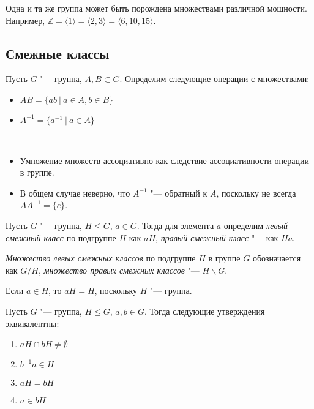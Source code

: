 \begin{note}
	Одна и та же группа может быть порождена множествами различной мощности. Например, $\mathbb{Z} = \langle 1\rangle = \langle 2, 3\rangle = \langle 6, 10, 15\rangle$.
\end{note}

\subsection{Смежные классы}

\begin{definition}
	Пусть $G$ "--- группа, $A, B \subset G$. Определим следующие операции с множествами:
	\begin{itemize}
		\item $AB = \{ab~|~a \in A, b \in B\}$
		\item $A^{-1} = \{a^{-1}~|~a\in A\}$
	\end{itemize}
\end{definition}

\begin{note}~
	\begin{itemize}
		\item Умножение множеств ассоциативно как следствие ассоциативности операции в группе.
		\item В общем случае неверно, что $A^{-1}$ "--- обратный к $A$, поскольку не всегда $AA^{-1} = \{e\}$.
	\end{itemize}
\end{note}

\begin{definition}
	Пусть $G$ "--- группа, $H \le G$, $a \in G$. Тогда для элемента $a$ определим \textit{левый смежный класс} по подгруппе $H$ как $aH$, \textit{правый смежный класс} "--- как $Ha$.
\end{definition}

\begin{definition}
	\textit{Множество левых смежных классов} по подгруппе $H$ в группе $G$ обозначается как $G/H$, \textit{множество правых смежных классов} "--- $H\backslash G$.
\end{definition}

\begin{note}
	Если $a \in H$, то $aH = H$, поскольку $H$ "--- группа.
\end{note}

\begin{proposition}
	Пусть $G$ "--- группа, $H \le G$, $a, b \in G$. Тогда следующие утверждения эквивалентны:
	\begin{enumerate}
		\item $aH \cap bH \ne \emptyset$
		\item $b^{-1}a \in H$
		\item $aH = bH$
		\item $a \in bH$
	\end{enumerate}
\end{proposition}

